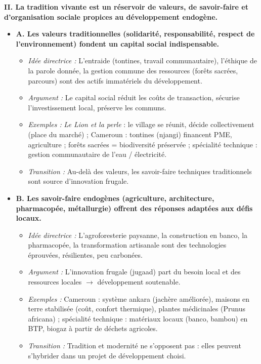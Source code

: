 \documentclass[11pt]{article}
\begin{document}
\begin{exoresolu}
\bigskip
\textbf{II. La tradition vivante est un réservoir de valeurs, de savoir-faire et d'organisation sociale propices au développement endogène.}
\begin{itemize}
\item \textbf{A. Les valeurs traditionnelles (solidarité, responsabilité, respect de l'environnement) fondent un capital social indispensable.}
      \begin{itemize}
      \item \textit{Idée directrice :} L'entraide (tontines, travail communautaire), l'éthique de la parole donnée, la gestion commune des ressources (forêts sacrées, parcours) sont des actifs immatériels du développement.
      \item \textit{Argument :} Le capital social réduit les coûts de transaction, sécurise l'investissement local, préserve les communs.
      \item \textit{Exemples :} \emph{Le Lion et la perle} : le village se réunit, décide collectivement (place du marché) ; Cameroun : tontines (njangi) financent PME, agriculture ; forêts sacrées = biodiversité préservée ; spécialité technique : gestion communautaire de l'eau / électricité.
      \item \textit{Transition :} Au-delà des valeurs, les savoir-faire techniques traditionnels sont source d'innovation frugale.
      \end{itemize}
\item \textbf{B. Les savoir-faire endogènes (agriculture, architecture, pharmacopée, métallurgie) offrent des réponses adaptées aux défis locaux.}
      \begin{itemize}
      \item \textit{Idée directrice :} L'agroforesterie paysanne, la construction en banco, la pharmacopée, la transformation artisanale sont des technologies éprouvées, résilientes, peu carbonées.
      \item \textit{Argument :} L'innovation frugale (jugaad) part du besoin local et des ressources locales $\rightarrow$ développement soutenable.
      \item \textit{Exemples :} Cameroun : système \og ankara \fg (jachère améliorée), maisons en terre stabilisée (coût, confort thermique), plantes médicinales (Prunus africana) ; spécialité technique : matériaux locaux (banco, bambou) en BTP, biogaz à partir de déchets agricoles.
      \item \textit{Transition :} Tradition et modernité ne s'opposent pas : elles peuvent s'hybrider dans un projet de développement choisi.
      \end{itemize}
\end{itemize}


\end{exoresolu}
\end{document}
